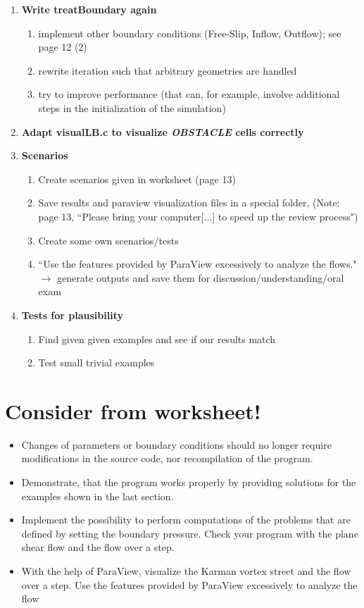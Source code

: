 \documentclass[a4paper]{article}
\newcommand{\qm}[1]{``#1"}							%
\newcommand{\ra}{\rightarrow}						%
\begin{document}
\begin{enumerate}
\item  \textbf{Write treatBoundary again}
\begin{enumerate}
\item implement other boundary conditions (Free-Slip, Inflow, Outflow); see page 12 (2)
\item rewrite iteration such that arbitrary geometries are handled
\item try to improve performance (that can, for example, involve additional steps in the initialization of the simulation)
\end{enumerate}

\item \textbf{Adapt visualLB.c to visualize \textsl{OBSTACLE} cells correctly}

\item \textbf{Scenarios}
\begin{enumerate}
\item Create scenarios given in worksheet (page 13) 
\item Save results and paraview visualization files in a special folder, (Note: page 13, \qm{Please bring your computer[...] to speed up the review process})
\item Create some own scenarios/tests
\item \qm{Use the features provided by ParaView excessively to analyze the flows.} $ \ra $ generate outputs and save them for discussion/understanding/oral exam 
\end{enumerate}

\item \textbf{Tests for plausibility}
\begin{enumerate}
\item Find given given examples and see if our results match
\item Test small trivial examples
\end{enumerate}

\end{enumerate} 


\section{Consider from worksheet!}
\begin{itemize}
\item Changes of parameters or boundary conditions should no longer require modifications in the source code, nor recompilation of the program.
\item Demonstrate, that the program works properly by providing solutions for the examples shown in the last section.
\item Implement the possibility to perform computations of the problems that are defined by setting the boundary pressure. Check your program with the plane shear flow and the flow over a step.
\item With the help of ParaView, visualize the Karman vortex street and the flow over a step. Use the features provided by ParaView excessively to analyze the flow
\end{itemize}
\end{document}
